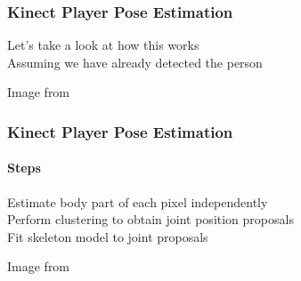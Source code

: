 \documentclass[xetex,professionalfont]{beamer}
\begin{document}

\begin{frame}
\frametitle{Kinect Player Pose Estimation}

Let's take a look at how this works\\\medskip
Assuming we have already detected the person


\bigskip
\begin{center}
    {\centering Image from \cite{shotton2011}}
\end{center}

\end{frame}


\begin{frame}
\frametitle{Kinect Player Pose Estimation}
\framesubtitle{Steps}

Estimate body part of each pixel independently\\\medskip
Perform clustering to obtain joint position proposals\\\medskip
Fit skeleton model to joint proposals

\bigskip
\begin{center}
    {\centering Image from \cite{shotton2011}}
\end{center}

\end{frame}

\end{document}
